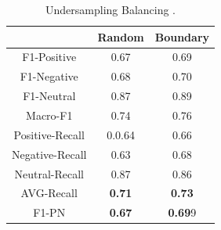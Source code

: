 \documentclass[conference]{IEEEtran}
\begin{document}
\begin{table}[!ht]
	\large        %
	\caption{Undersampling Balancing .}\label{label}
	\centering    %
	\begin{tabular}{|c|c|c|}
		\hline
		&Random&Boundary\\     %
		\hline
		F1-Positive&0.67 &0.69\\
		\hline
		F1-Negative&0.68&0.70\\
		\hline
		F1-Neutral&0.87&0.89\\
		\hline
		Macro-F1&0.74&0.76\\
		\hline
		Positive-Recall&0.0.64&0.66\\
		\hline
		Negative-Recall&0.63&0.68\\
		\hline
		Neutral-Recall&0.87&0.86\\
		\hline
		AVG-Recall&\textbf{0.71}&\textbf{0.73}\\
		\hline
		F1-PN&\textbf{0.67}&\textbf{0.69}9\\
		\hline
	\end{tabular}
\end{table}
\end{document}
